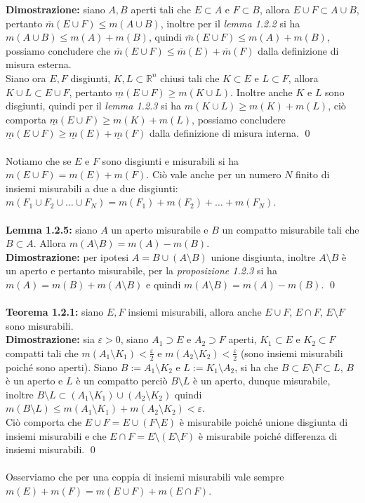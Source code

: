 \documentclass{article}
\numberwithin{equation}{subsection}
\begin{document}
\textbf{Dimostrazione:} siano $A, B$ aperti tali che $E \subset A$ e $F \subset B$, allora $E \cup F \subset A \cup B$, pertanto $\overline{m}(E \cup F) \leq m(A \cup B)$, inoltre per il \textit{lemma 1.2.2} si ha $m(A \cup B) \leq m(A) + m(B)$, quindi $\overline{m}(E \cup F) \leq m(A) + m(B)$, possiamo concludere che $\overline{m}(E \cup F) \leq \overline{m}(E) + \overline{m}(F)$ dalla definizione di misura esterna. \\
Siano ora $E, F$ disgiunti, $K, L \subset \mathbb{R}^n$ chiusi tali che $K \subset E$ e $L \subset F$, allora $K \cup L \subset E \cup F$, pertanto $\underline{m}(E \cup F) \geq m(K \cup L)$. Inoltre anche $K$ e $L$ sono disgiunti, quindi per il \textit{lemma 1.2.3} si ha $m(K \cup L) \geq m(K) + m(L)$, ciò comporta $\underline{m}(E \cup F) \geq m(K) + m(L)$, possiamo concludere $\underline{m}(E \cup F) \geq \underline{m}(E) + \underline{m}(F)$ dalla definizione di misura interna. \qed \\ \\
Notiamo che se $E$ e $F$ sono disgiunti e misurabili si ha $m(E \cup F) = m(E) + m(F)$. Ciò vale anche per un numero $N$ finito di insiemi misurabili a due a due disgiunti: $m(F_1 \cup F_2 \cup \dots \cup F_N) = m(F_1) + m(F_2) + \dots + m(F_N)$. \\ \\
\textbf{Lemma 1.2.5:} siano $A$ un aperto misurabile e $B$ un compatto misurabile tali che $B \subset A$. Allora $m(A \setminus B) = m(A) - m(B)$. \\

\textbf{Dimostrazione:} per ipotesi $A = B \cup (A \setminus B)$ unione disgiunta, inoltre $A \setminus B$ è un aperto e pertanto misurabile, per la \textit{proposizione 1.2.3} si ha $m(A) = m(B) + m(A \setminus B)$ e quindi $m(A \setminus B) = m(A) - m(B)$. \qed \\ \\
\textbf{Teorema 1.2.1:} siano $E, F$ insiemi misurabili, allora anche $E \cup F$, $E \cap F$, $E \setminus F$ sono misurabili. \\

\textbf{Dimostrazione:} sia $\varepsilon > 0$, siano $A_1 \supset E$ e $A_2 \supset F$ aperti, $K_1 \subset E$ e $K_2 \subset F$ compatti tali che $m(A_1 \setminus K_1) < \frac{\varepsilon}{2}$ e $m(A_2 \setminus K_2) < \frac{\varepsilon}{2}$ (sono insiemi misurabili poiché sono aperti). Siano $B := A_1 \setminus K_2$ e $L := K_1 \setminus A_2$, si ha che $B \subset E \setminus F \subset L$, $B$ è un aperto e $L$ è un compatto perciò $B \setminus L$ è un aperto, dunque misurabile, inoltre $B \setminus L \subset (A_1 \setminus K_1) \cup (A_2 \setminus K_2)$ quindi $m(B \setminus L) \leq m(A_1 \setminus K_1) + m(A_2 \setminus K_2) < \varepsilon$. \\
Ciò comporta che $E \cup F = E \cup (F \setminus E)$ è misurabile poiché unione disgiunta di insiemi misurabili e che $E \cap F = E \setminus (E \setminus F)$ è misurabile poiché differenza di insiemi misurabili. \qed \\ \\
Osserviamo che per una coppia di insiemi misurabili vale sempre $m(E) + m(F) = m(E \cup F) + m(E \cap F)$. \\ \\
\end{document}
